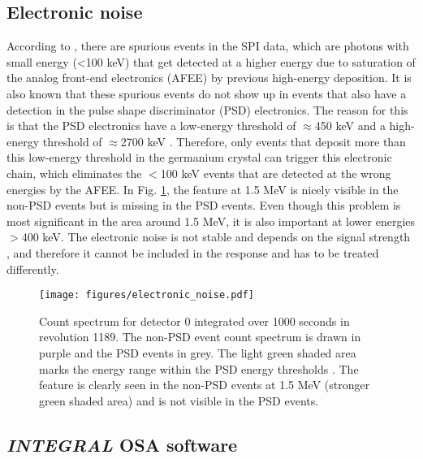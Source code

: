 \documentclass{aa}
\begin{document}
\subsection{Electronic noise}
\label{electronic}
According to \citet{spi_electronic_noise}, there are spurious events in the SPI data, which are photons with small energy (<100 keV) that get detected at a higher energy due to saturation of the analog front-end electronics (AFEE) by previous high-energy deposition. It is also known that these spurious events do not show up in events that also have a detection in the pulse shape discriminator (PSD) electronics. The reason for this is that the PSD electronics have a low-energy threshold of $\approx$450 keV and a high-energy threshold of $\approx$2700 keV \citep[the exact values have been changed a few times during the mission; ][]{spi_electronic_noise}. Therefore, only events that deposit more than this low-energy threshold in the germanium crystal can trigger this electronic chain, which eliminates the $<$100 keV events that are detected at the wrong energies by the AFEE.  In Fig. \ref{fig:electronic}, the feature at 1.5 MeV is nicely visible in the non-PSD events but is missing in the PSD events. Even though this problem is most significant in the area around 1.5 MeV, it is also important at lower energies $>$400 keV. The electronic noise is not stable and depends on the signal strength \citep{spi_electronic_noise}, and therefore it cannot be included in the response and has to be treated differently.

\begin{figure}[ht]
    \begin{centering}
        \texttt{[image: figures/electronic\_noise.pdf]}
        \caption{Count spectrum for detector 0 integrated over 1000 seconds in revolution 1189. The non-PSD event count spectrum is drawn in purple and the PSD events in grey. The light green shaded area marks the energy range within the PSD energy thresholds \citep{spi_electronic_noise}. The feature is clearly seen in the non-PSD events at 1.5 MeV (stronger green shaded area) and is not visible in the PSD events.}
        \label{fig:electronic}
    \end{centering}
\end{figure}

\subsection{\textit{INTEGRAL} OSA software}
\label{OSA}
\end{document}
